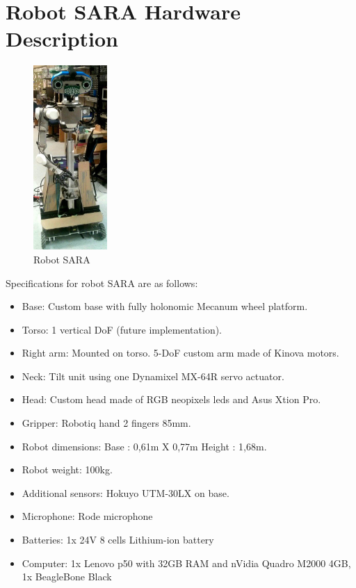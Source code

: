 \section*{Robot SARA Hardware Description}

\setlength\intextsep{0pt}
\begin{figure}
	\centering
	\includegraphics[width=0.25\textwidth]{images/sara.png}
	\caption{Robot SARA}
	\label{fig:wall-e}
\end{figure}

Specifications for robot SARA are as follows:

\begin{itemize}
	\item Base: Custom base with fully holonomic Mecanum wheel platform.
	\item Torso: 1 vertical DoF (future implementation).
	\item Right arm: Mounted on torso. 5-DoF custom arm made of Kinova motors.
	\item Neck: Tilt unit using one Dynamixel MX-64R servo actuator.
	\item Head: Custom head made of RGB neopixels leds and Asus Xtion Pro.
	\item Gripper: Robotiq hand 2 fingers 85mm.
	\item Robot dimensions: Base : 0,61m X 0,77m Height : 1,68m.
	\item Robot weight: 100kg.
	\item Additional sensors: Hokuyo UTM-30LX on base.
	\item Microphone: Rode microphone
	\item Batteries: 1x 24V 8 cells Lithium-ion battery
	\item Computer: 1x Lenovo p50 with 32GB RAM and nVidia Quadro M2000 4GB, 1x BeagleBone Black
	
\end{itemize}


